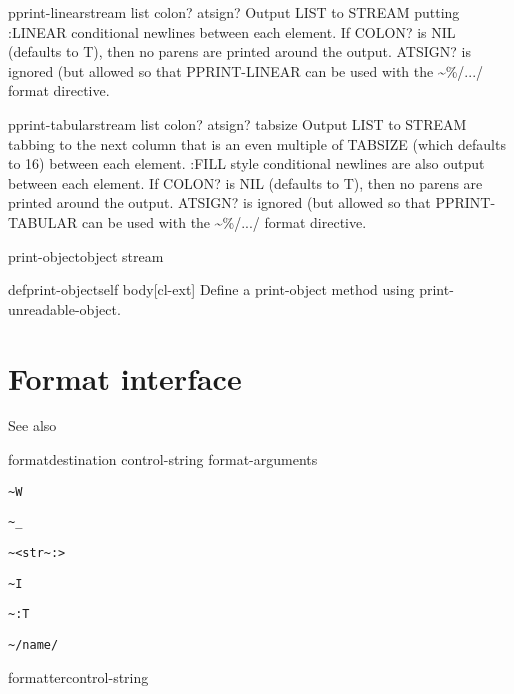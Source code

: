 \documentclass[10pt,english]{book}
\begin{document}
\begin{function}{pprint-linear}{stream list \op colon? atsign?}
  Output LIST to STREAM putting :LINEAR conditional newlines between each
   element. If COLON? is NIL (defaults to T), then no parens are printed
   around the output. ATSIGN? is ignored (but allowed so that PPRINT-LINEAR
   can be used with the \~{}\%/.../ format directive.
\end{function}

\begin{function}{pprint-tabular}{stream list \op colon? atsign? tabsize}
  Output LIST to STREAM tabbing to the next column that is an even multiple
   of TABSIZE (which defaults to 16) between each element. :FILL style
   conditional newlines are also output between each element. If COLON? is
   NIL (defaults to T), then no parens are printed around the output.
   ATSIGN? is ignored (but allowed so that PPRINT-TABULAR can be used with
   the \~{}\%/.../ format directive.
\end{function}

\begin{generic}{print-object}{object stream}
  
\end{generic}

\begin{macro}{defprint-object}{self \body body}[cl-ext]
  Define a print-object method using print-unreadable-object.
\end{macro}

\section{Format interface}
\label{sec:form-direct-interf}

See also 

\begin{function}{format}{destination control-string \rest format-arguments}
\begin{list}{}{}
\item \verb!~W!
\item \verb!~_!
\item \verb!~<str~:>!
\item \verb!~I!
\item \verb!~:T!
\item \verb!~/name/!
\end{list}
\end{function}

\begin{macro}{formatter}{control-string}
  
\end{macro}
\end{document}
